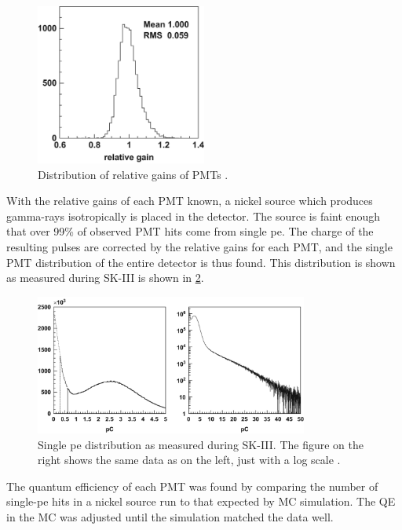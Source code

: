 \begin{figure}
\centering
\includegraphics[width=0.5\textwidth,keepaspectratio]{figures/relative_gain.png}
\caption{Distribution of relative gains of PMTs \cite{Abe:2013gga}.}
\label{fig:relative_gain}	
\end{figure} 
With the relative gains of each PMT known, a nickel source which produces gamma-rays isotropically is placed in the detector.  The source is faint enough that over 99\% of observed PMT hits come from single pe.  The charge of the resulting pulses are corrected by the relative gains for each PMT, and the single PMT distribution of the entire detector is thus found.  This distribution is shown as measured during SK-III is shown in \cref{fig:single_pe}.\par
\begin{figure}
\centering
\includegraphics[width=0.8\textwidth,keepaspectratio]{figures/single_pe.png}
\caption{Single pe distribution as measured during SK-III.  The figure on the right shows the same data as on the left, just with a log scale \cite{Abe:2013gga}.}
\label{fig:single_pe}	
\end{figure}
The quantum efficiency of each PMT was found by comparing the number of single-pe hits in a nickel source run to that expected by MC simulation.  The QE in the MC was adjusted until the simulation matched the data well.\par
